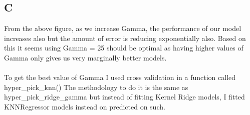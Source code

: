 \documentclass[11pt]{article} %
\begin{document}
\subsection{C}
\begin{figure}[h]
\centering
{}
\qquad
\end{figure}
From the above figure, as we increase Gamma, the performance of our model increases also but the amount of error is reducing exponentially also. Based on this it seems using Gamma = 25 should be optimal as having higher values of Gamma only gives us very marginally better models.\\\\ To get the best value of Gamma I used cross validation in a function called hyper\_pick\_knn() The methodology to do it is the same as hyper\_pick\_ridge\_gamma but instead of fitting Kernel Ridge models, I fitted KNNRegressor models instead on predicted on such.
\begin{figure}[h]
\centering
{}
\qquad
{}
\qquad
\end{figure}
\end{document}
